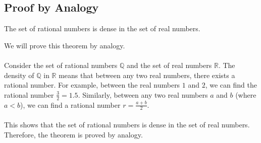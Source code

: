 \QED

\subsection{Proof by Analogy}

The set of rational numbers is dense in the set of real numbers.

We will prove this theorem by analogy.
\\\\	
Consider the set of rational numbers \( \mathbb{Q} \) and the set of real numbers \( \mathbb{R} \). The density of \( \mathbb{Q} \) in \( \mathbb{R} \) means that between any two real numbers, there exists a rational number.
For example, between the real numbers \( 1 \) and \( 2 \), we can find the rational number \( \frac{3}{2} = 1.5 \). Similarly, between any two real numbers \( a \) and \( b \) (where \( a < b \)), we can find a rational number \( r = \frac{a + b}{2} \).
\\\\
This shows that the set of rational numbers is dense in the set of real numbers.
Therefore, the theorem is proved by analogy.

\QED
\newpage


